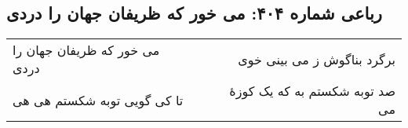 \begin{center}
\section*{رباعی شماره ۴۰۴: می خور که ظریفان جهان را دردی}
\label{sec:sh404}
\begin{longtable}{l p{0.5cm} r}
می خور که ظریفان جهان را دردی
&&
برگرد بناگوش ز می بینی خوی
\\
تا کی گویی توبه شکستم هی هی
&&
صد توبه شکستم به که یک کوزهٔ می
\\
\end{longtable}
\end{center}
